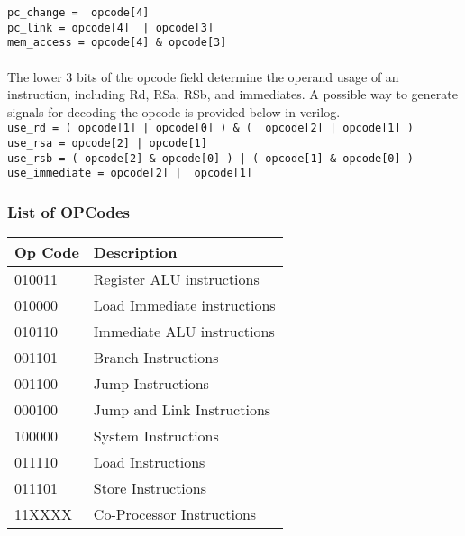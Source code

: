 \documentclass[letterpaper, 11pt]{article}
\begin{document}
\texttt{pc\_change = ~opcode[4]}\\
\texttt{pc\_link = opcode[4] ~| opcode[3]}\\
\texttt{mem\_access = opcode[4] \& opcode[3]}\\

\paragraph{} The lower 3 bits of the opcode field determine the operand usage of an instruction, including Rd, RSa, RSb, and immediates.
A possible way to generate signals for decoding the opcode is provided below in verilog. \\

\texttt{use\_rd = ( opcode[1] | opcode[0] ) \& ( ~opcode[2] | opcode[1] ) }\\
\texttt{use\_rsa = opcode[2] | opcode[1] }\\
\texttt{use\_rsb = ( opcode[2] \& opcode[0] ) | ( opcode[1] \& opcode[0] ) }\\
\texttt{use\_immediate = opcode[2] | ~opcode[1] }\\



\subsubsection{List of OPCodes}
	\begin{center}
		\begin{tabular}{|l|l|}
			\hline
			Op Code & Description 				 	\\ \hline
			010011	& Register ALU instructions	 	\\ \hline
			010000	& Load Immediate instructions 	\\ \hline
			010110	& Immediate ALU instructions	\\ \hline
			001101	& Branch Instructions			\\ \hline
			001100	& Jump Instructions				\\ \hline
			000100	& Jump and Link Instructions	\\ \hline
			100000	& System Instructions			\\ \hline
			011110	& Load Instructions				\\ \hline
			011101	& Store Instructions			\\ \hline
			11XXXX	& Co-Processor Instructions		\\ \hline

		\end{tabular}
	\end{center}
\end{document}
